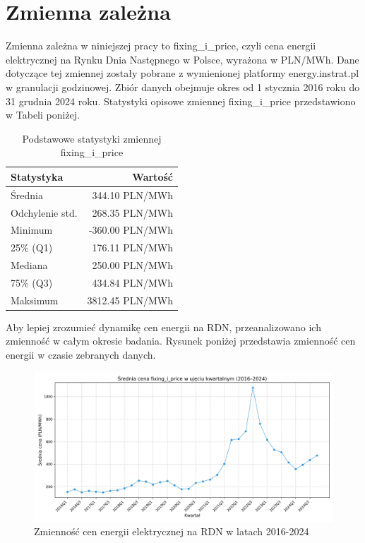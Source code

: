 \section{Zmienna zależna}
Zmienna zależna w niniejszej pracy to fixing\_i\_price, czyli cena energii elektrycznej na Rynku Dnia Następnego w Polsce, wyrażona w PLN/MWh. Dane dotyczące tej zmiennej zostały pobrane z wymienionej platformy energy.instrat.pl w granulacji godzinowej. Zbiór danych obejmuje okres od 1 stycznia 2016 roku do 31 grudnia 2024 roku. Statystyki opisowe zmiennej fixing\_i\_price przedstawiono w Tabeli poniżej. 
\begin{table}[H]
    \centering
    \begin{tabular}{|l|r|}
    \hline
    \textbf{Statystyka} & \textbf{Wartość} \\ \hline
    Średnia             & 344.10 PLN/MWh   \\ \hline
    Odchylenie std.     & 268.35 PLN/MWh   \\ \hline
    Minimum             & -360.00 PLN/MWh  \\ \hline
    25\% (Q1)           & 176.11 PLN/MWh   \\ \hline
    Mediana             & 250.00 PLN/MWh   \\ \hline
    75\% (Q3)           & 434.84 PLN/MWh   \\ \hline
    Maksimum            & 3812.45 PLN/MWh  \\ \hline
    \end{tabular}
    \caption{Podstawowe statystyki zmiennej fixing\_i\_price}
    \label{tab:fixing-i-price-stats}
\end{table}

Aby lepiej zrozumieć dynamikę cen energii na RDN, przeanalizowano ich zmienność w całym okresie badania. Rysunek poniżej przedstawia zmienność cen energii w czasie zebranych danych.

\begin{figure}[H]
    \centering
    \includegraphics[width=\textwidth]{../plots/quarterly_fixing_i_price.png}
    \caption{Zmienność cen energii elektrycznej na RDN w latach 2016-2024}
    \label{fig:fixing-i-price-trend}
\end{figure}

